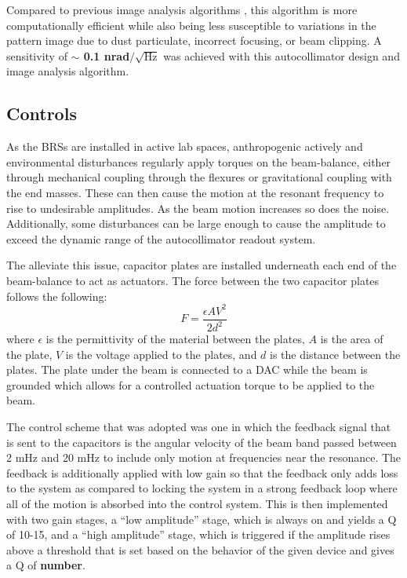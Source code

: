 \documentclass [12pt, proquest]{uwthesis}[2019]
\begin{document}
Compared to previous image analysis algorithms \cite{MSAPaper}, this algorithm is more computationally efficient while also being less susceptible to variations in the pattern image due to dust particulate, incorrect focusing, or beam clipping. A sensitivity of \textbf{$\sim$ 0.1 nrad$/\sqrt{\text{Hz}}$} was achieved with this autocollimator design and image analysis algorithm.

\subsection{Controls}

\quad As the BRSs are installed in active lab spaces, anthropogenic actively and environmental disturbances regularly apply torques on the beam-balance, either through mechanical coupling through the flexures or gravitational coupling with the end masses. These can then cause the motion at the resonant frequency to rise to undesirable amplitudes. As the beam motion increases so does the noise. Additionally, some disturbances can be large enough to cause the amplitude to exceed the dynamic range of the autocollimator readout system.

The alleviate this issue, capacitor plates are installed underneath each end of the beam-balance to act as actuators. The force between the two capacitor plates follows the following: 
\begin{equation}
F=\frac{\epsilon A V^2}{2d^2} \label{cap}
\end{equation}
where $\epsilon$ is the permittivity of the material between the plates, $A$ is the area of the plate, $V$ is the voltage applied to the plates, and $d$ is the distance between the plates. The plate under the beam is connected to a DAC while the beam is grounded which allows for a controlled actuation torque to be applied to the beam. 

The control scheme that was adopted was one in which the feedback signal that is sent to the capacitors is the angular velocity of the beam band passed between 2 mHz and 20 mHz to include only motion at frequencies near the resonance. The feedback is additionally applied with low gain so that the feedback only adds loss to the system as compared to locking the system in a strong feedback loop where all of the motion is absorbed into the control system. This is then implemented with two gain stages, a ``low amplitude'' stage, which is always on and yields a Q of 10-15, and a ``high amplitude'' stage, which is triggered if the amplitude rises above a threshold that is set based on the behavior of the given device and gives a Q of \textbf{number}.
\end{document}
